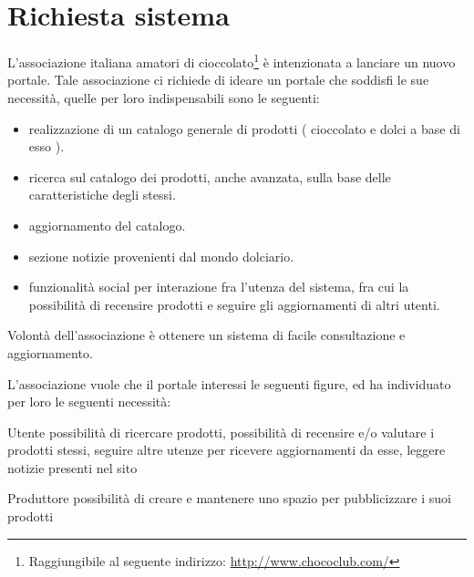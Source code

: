 \chapter{Richiesta sistema}

L’associazione italiana amatori di cioccolato\footnote{Raggiungibile al seguente indirizzo: \url{http://www.chococlub.com/}} è intenzionata a lanciare un nuovo portale.
Tale associazione ci richiede di ideare un portale che soddisfi le sue necessità, quelle per loro indispensabili sono le seguenti:
\begin{itemize}
    \item realizzazione di un catalogo generale di prodotti ( cioccolato e dolci a base di esso ).
    \item ricerca sul catalogo dei prodotti, anche avanzata, sulla base delle caratteristiche degli stessi.
    \item aggiornamento del catalogo.
    \item sezione notizie provenienti dal mondo dolciario.
    \item funzionalità social per interazione fra l'utenza del sistema, fra cui la possibilità di recensire prodotti e seguire gli aggiornamenti di altri utenti.
\end{itemize}
Volontà dell'associazione è ottenere un sistema di facile consultazione e aggiornamento.

L'associazione vuole che il portale interessi le seguenti figure, ed ha individuato per loro le seguenti necessità:
\begin{descriptionInd}
    \item[Utente] possibilità di ricercare prodotti, possibilità di recensire e/o valutare i prodotti stessi, seguire altre utenze per ricevere aggiornamenti da esse, leggere notizie presenti nel sito
    \item[Produttore] possibilità di creare e mantenere uno spazio per pubblicizzare i suoi prodotti
\end{descriptionInd}




